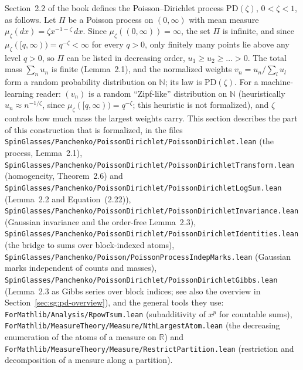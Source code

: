 Section~2.2 of the book defines the Poisson--Dirichlet process $\mathrm{PD}(\zeta)$, $0<\zeta<1$, as follows. Let $\Pi$ be a Poisson process on $(0,\infty)$ with mean measure
$\mu_\zeta(dx)=\zeta x^{-1-\zeta}\,dx$. Since $\mu_\zeta((0,\infty))=\infty$, the set $\Pi$ is infinite, and since $\mu_\zeta([q,\infty))=q^{-\zeta}<\infty$ for every $q>0$, only finitely many points lie above any level $q>0$, so $\Pi$ can be listed in decreasing order, $u_1\ge u_2\ge\dots>0$. The total mass $\sum_nu_n$ is finite (Lemma~2.1), and the normalized weights $v_n=u_n/\sum_lu_l$ form a random probability distribution on $\mathbb N$; its law is $\mathrm{PD}(\zeta)$. For a machine-learning reader: $(v_n)$ is a random ``Zipf-like'' distribution on $\mathbb N$ (heuristically $u_n\approx n^{-1/\zeta}$, since $\mu_\zeta([q,\infty))=q^{-\zeta}$; this heuristic is not formalized), and $\zeta$ controls how much mass the largest weights carry.
This section describes the part of this construction that is formalized, in the files \texttt{SpinGlasses/Panchenko/PoissonDirichlet/PoissonDirichlet.lean} (the process, Lemma~2.1), \texttt{SpinGlasses/Panchenko/PoissonDirichlet/PoissonDirichletTransform.lean} (homogeneity, Theorem~2.6) and \texttt{SpinGlasses/Panchenko/PoissonDirichlet/PoissonDirichletLogSum.lean} (Lemma~2.2 and Equation~(2.22)), \texttt{SpinGlasses/Panchenko/PoissonDirichlet/PoissonDirichletInvariance.lean} (Gaussian invariance and the order-free Lemma~2.3), \texttt{SpinGlasses/Panchenko/PoissonDirichlet/PoissonDirichletIdentities.lean} (the bridge to sums over block-indexed atoms), \texttt{SpinGlasses/Panchenko/Poisson/PoissonProcessIndepMarks.lean} (Gaussian marks independent of counts and masses), \texttt{SpinGlasses/Panchenko/PoissonDirichlet/PoissonDirichletGibbs.lean} (Lemma~2.3 as Gibbs series over block indices; see also the overview in Section~\ref{sec:sg:pd-overview}), and the general tools they use:
\texttt{ForMathlib/Analysis/RpowTsum.lean} (subadditivity of $x^p$ for countable sums),
\texttt{ForMathlib/MeasureTheory/Measure/NthLargestAtom.lean} (the decreasing enumeration of the atoms of a measure on $\mathbb R$) and
\texttt{ForMathlib/MeasureTheory/Measure/RestrictPartition.lean} (restriction and decomposition of a measure along a partition).
